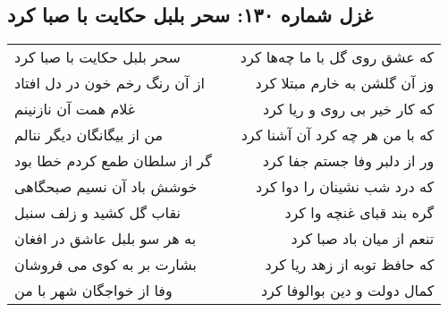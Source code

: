 \begin{center}
\section*{غزل شماره ۱۳۰: سحر بلبل حکایت با صبا کرد}
\label{sec:sh130}
\begin{longtable}{l p{0.5cm} r}
سحر بلبل حکایت با صبا کرد
&&
که عشق روی گل با ما چه‌ها کرد
\\
از آن رنگ رخم خون در دل افتاد
&&
وز آن گلشن به خارم مبتلا کرد
\\
غلام همت آن نازنینم
&&
که کار خیر بی روی و ریا کرد
\\
من از بیگانگان دیگر ننالم
&&
که با من هر چه کرد آن آشنا کرد
\\
گر از سلطان طمع کردم خطا بود
&&
ور از دلبر وفا جستم جفا کرد
\\
خوشش باد آن نسیم صبحگاهی
&&
که درد شب نشینان را دوا کرد
\\
نقاب گل کشید و زلف سنبل
&&
گره بند قبای غنچه وا کرد
\\
به هر سو بلبل عاشق در افغان
&&
تنعم از میان باد صبا کرد
\\
بشارت بر به کوی می فروشان
&&
که حافظ توبه از زهد ریا کرد
\\
وفا از خواجگان شهر با من
&&
کمال دولت و دین بوالوفا کرد
\\
\end{longtable}
\end{center}
